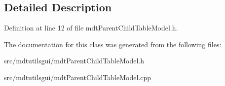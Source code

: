 \subsection{Detailed Description}


Definition at line 12 of file mdtParentChildTableModel.h.



The documentation for this class was generated from the following files:\begin{DoxyCompactItemize}
\item 
src/mdtutilsgui/mdtParentChildTableModel.h\item 
src/mdtutilsgui/mdtParentChildTableModel.cpp\end{DoxyCompactItemize}
